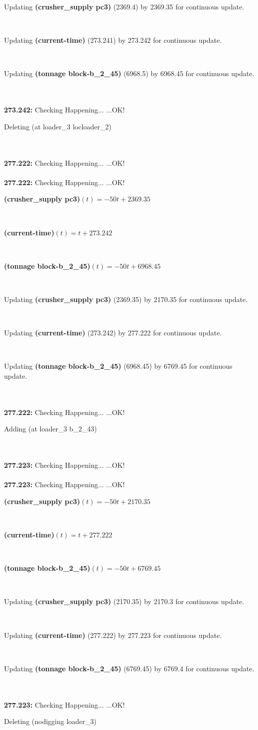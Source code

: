 \documentclass[a4paper,12pt]{article}
\newcommand{\atime}[1]{{\bf #1:}}
\newcommand{\exprn}[1]{{\sf #1}}
\newcommand{\fexprn}[1]{{\small {\bf #1}}}
\newcommand{\checkhappening}{Checking Happening... }
\newcommand{\listrow}[1]{\begin{minipage}[t]{11.5cm} #1 \end{minipage}}
\newcommand{\happeningOK}{...OK!}
\newcommand{\assignmentcts}[3]{\listrow{Updating \fexprn{#1} (#2) by #3 for continuous update.}}
\newcommand{\function}[2]{\listrow{\fexprn{#1}$(t) = #2$}}
\newcommand{\adding}[1]{\listrow{Adding \exprn{#1} }}
\newcommand{\deleting}[1]{\listrow{Deleting \exprn{#1} }}
\begin{document}
\begin{tabbing}
 \> \assignmentcts{(crusher\_supply pc3)}{2369.4}{2369.35}\\
 \> \assignmentcts{(current-time)}{273.241}{273.242}\\
 \> \assignmentcts{(tonnage block-b\_2\_45)}{6968.5}{6968.45}\\
\\
\atime{273.242} \> \checkhappening\happeningOK\\
 \> \deleting{(at loader\_3 locloader\_2)}\\
\\
\atime{277.222} \> \checkhappening\happeningOK\\
\\
\atime{277.222} \> \checkhappening\happeningOK\\
 \> \function{(crusher\_supply pc3)}{ - 50t + 2369.35}\\
 \> \function{(current-time)}{t + 273.242}\\
 \> \function{(tonnage block-b\_2\_45)}{ - 50t + 6968.45}\\
 \> \assignmentcts{(crusher\_supply pc3)}{2369.35}{2170.35}\\
 \> \assignmentcts{(current-time)}{273.242}{277.222}\\
 \> \assignmentcts{(tonnage block-b\_2\_45)}{6968.45}{6769.45}\\
\\
\atime{277.222} \> \checkhappening\happeningOK\\
 \> \adding{(at loader\_3 b\_2\_43)}\\
\\
\atime{277.223} \> \checkhappening\happeningOK\\
\\
\atime{277.223} \> \checkhappening\happeningOK\\
 \> \function{(crusher\_supply pc3)}{ - 50t + 2170.35}\\
 \> \function{(current-time)}{t + 277.222}\\
 \> \function{(tonnage block-b\_2\_45)}{ - 50t + 6769.45}\\
 \> \assignmentcts{(crusher\_supply pc3)}{2170.35}{2170.3}\\
 \> \assignmentcts{(current-time)}{277.222}{277.223}\\
 \> \assignmentcts{(tonnage block-b\_2\_45)}{6769.45}{6769.4}\\
\\
\atime{277.223} \> \checkhappening\happeningOK\\
 \> \deleting{(nodigging loader\_3)}\\

\end{tabbing}
\end{document}
